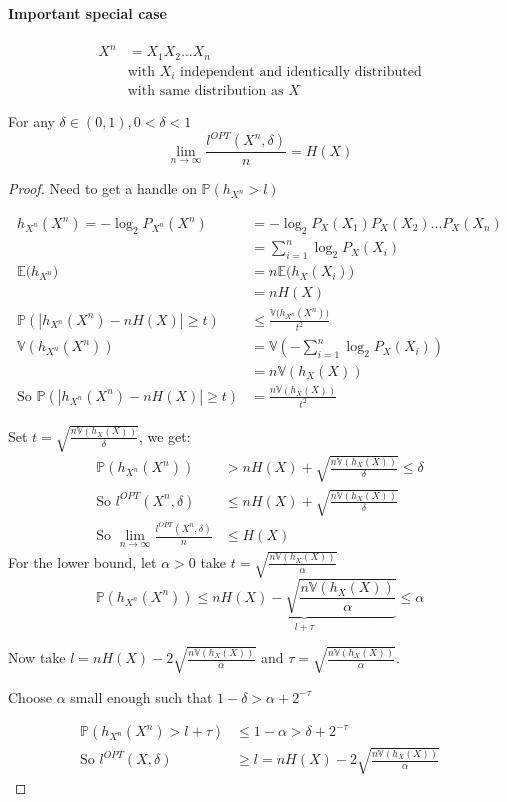 \paragraph{Important special case}
\begin{align*}
X^n & =X_1X_2...X_n\\
& \text{with $X_i$ independent and identically distributed}\\
& \text{with same distribution as $X$}
\end{align*}


\begin{thm}
For any $\delta \in (0,1), 0<\delta<1$
\[\lim_{n\to \infty} \frac{l^{OPT}(X^n,\delta)}{n} = H(X)\]
\end{thm}

\begin{proof}
Need to get a handle on $\mathbb{P}(h_{X^n}>l)$

\begin{align*}
h_{X^n}(X^n)=-\log_2 P_{X^n}(X^n) & = -\log_2 P_X(X_1)P_X(X_2)...P_X(X_n)\\
& = \sum _{i=1}^n \log_2 P_X(X_i)\\
\mathbb{E} \big(h_{X^n}\big) & = n \mathbb{E}\big( h_X(X_i)\big)\\
& = nH(X)\\
\mathbb{P} (|h_{X^n}(X^n)-nH(X)|\geq t) & \leq \frac{\mathbb{V}\big(h_{X^n}(X^n)\big)}{t^2}\\
\mathbb{V}(h_{X^n}(X^n)) & = \mathbb{V} \left( -\sum_{i=1}^n \log_2 P_X(X_i) \right)\\
& = n \mathbb{V}(h_X(X))\\
\text{So } \mathbb{P} (|h_{X^n}(X^n)-nH(X)|\geq t) & = \frac{n\mathbb{V} (h_X(X))}{t^2}
\end{align*}

Set $t=\sqrt{\frac{n\mathbb{V}(h_X(X))}{\delta}}$, we get:
\begin{align*}
\mathbb{P}(h_{X^n}(X^n)) & > nH(X)+ \sqrt{\frac{n\mathbb{V}(h_X(X))}{\delta}} \leq \delta\\
\text{So } l^{OPT}(X^n,\delta) & \leq nH(X)+\sqrt{\frac{n\mathbb{V}(h_X(X))}{\delta}}\\
\text{So } \lim_{n\to\infty} \frac{l^{OPT}(X^n,\delta)}{n} & \leq H(X)
\end{align*}
For the lower bound, let $\alpha > 0$ take $t=\sqrt{\frac{n\mathbb{V}(h_X(X))}{\alpha}}$
\[\mathbb{P}(h_{X^n}(X^n))\leq \underbrace{nH(X)-\sqrt{\frac{n\mathbb{V}(h_X(X))}{\alpha}}}_{l+\tau} \leq \alpha\]

Now take $l=nH(X)-2\sqrt{\frac{n\mathbb{V}(h_X(X))}{\alpha}}$ and $\tau = \sqrt{\frac{n\mathbb{V}(h_X(X))}{\alpha}}$.

Choose $\alpha$ small enough such that $1-\delta> \alpha + 2^{-\tau}$

\begin{align*}
\mathbb{P}(h_{X^n}(X^n)>l+\tau) & \leq 1 - \alpha > \delta + 2^{-\tau}\\
\text{So } l^{OPT}(X,\delta) &\geq l = nH(X)-2\sqrt{\frac{n\mathbb{V}(h_X(X))}{\alpha}}
\end{align*}
\end{proof}

